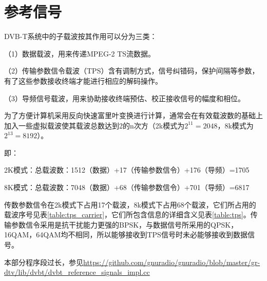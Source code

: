 	\section{参考信号}
		\par DVB-T系统中的子载波按其作用可以分为三类：
		\par （1）数据载波，用来传递MPEG-2 TS流数据。
		\par （2）传输参数信令载波（TPS）含有调制方式，信号纠错码，保护间隔等参数，有了这些参数接收终端才能进行相应的解码操作。
		\par （3）导频信号载波，用来协助接收终端预估、校正接收信号的幅度和相位。
		\par 为了方便计算机采用反向快速富里叶变换进行计算，通常会在有效载波数的基础上加入一些虚拟载波使其载波总数达到2的n次方（2k模式为$2^{11}=2048$，8k模式为$2^{13}=8192$）。
		\par 即：
		\par 2K模式：总载波数：1512（数据）+17（传输参数信令）+176（导频）=1705
		\par 8K模式：总载波数：7048（数据）+68（传输参数信令）+701（导频）=6817
		\par 传数参数信令在2k模式下占用17个载波，8k模式下占用68个载波，它们所占用的载波序号见表\ref{table:tps_carrier}，它们所包含信息的详细含义见表\ref{table:tps}。传输参数信令采用是抗干扰能力更强的BPSK，与数据信号所采用的QPSK，16QAM，64QAM均不相同，所以能够接收到TPS信号时未必能够接收到数据信号。
		
		
		\par 本部分程序段过长，参见\href{https://github.com/gnuradio/gnuradio/blob/master/gr-dtv/lib/dvbt/dvbt\_reference\_signals\_impl.cc}{https://github.com/gnuradio/gnuradio/blob/master/gr-dtv/lib/dvbt/dvbt\_reference\_signals\_impl.cc}
